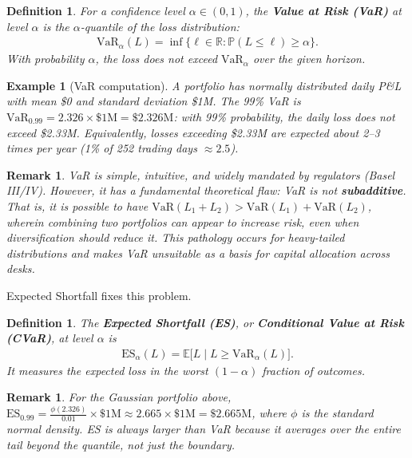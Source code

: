 \documentclass{report}
\theoremstyle{spacedplain}
\theoremstyle{spaceddefinition}
\newtheorem{definition}[theorem]{Definition}
\newtheorem{example}[theorem]{Example}
\theoremstyle{spacedremark}
\newtheorem{remark}[theorem]{Remark}
\begin{document}
\begin{definition}
For a confidence level $\alpha \in (0,1)$, the \textbf{Value at Risk (VaR)} at level $\alpha$ is the $\alpha$-quantile of the loss distribution:
\begin{align}
    \text{VaR}_\alpha(L) = \inf\bigl\{\ell \in \mathbb{R} : \mathbb{P}(L \leq \ell) \geq \alpha\bigr\}.
\end{align}
With probability $\alpha$, the loss does not exceed $\text{VaR}_\alpha$ over the given horizon.
\end{definition}

\begin{example}[VaR computation]
A portfolio has normally distributed daily P\&L with mean \$0 and standard deviation \$1M. The 99\% VaR is $\text{VaR}_{0.99} = 2.326 \times \$1\text{M} = \$2.326\text{M}$: with 99\% probability, the daily loss does not exceed \$2.33M. Equivalently, losses exceeding \$2.33M are expected about 2--3 times per year (1\% of 252 trading days $\approx 2.5$).
\end{example}

\begin{remark}
VaR is simple, intuitive, and widely mandated by regulators (Basel III/IV). However, it has a fundamental theoretical flaw: VaR is not \textbf{subadditive}. That is, it is possible to have $\text{VaR}(L_1 + L_2) > \text{VaR}(L_1) + \text{VaR}(L_2)$, wherein combining two portfolios can appear to increase risk, even when diversification should reduce it. This pathology occurs for heavy-tailed distributions and makes VaR unsuitable as a basis for capital allocation across desks.
\end{remark}

Expected Shortfall fixes this problem.

\begin{definition}
The \textbf{Expected Shortfall (ES)}, or \textbf{Conditional Value at Risk (CVaR)}, at level $\alpha$ is
\begin{align}
    \text{ES}_\alpha(L) = \mathbb{E}\bigl[L \mid L \geq \text{VaR}_\alpha(L)\bigr].
\end{align}
It measures the expected loss in the worst $(1-\alpha)$ fraction of outcomes.
\end{definition}

\begin{remark}
For the Gaussian portfolio above, $\text{ES}_{0.99} = \frac{\phi(2.326)}{0.01} \times \$1\text{M} \approx 2.665 \times \$1\text{M} = \$2.665\text{M}$, where $\phi$ is the standard normal density. ES is always larger than VaR because it averages over the entire tail beyond the quantile, not just the boundary. 
\end{remark}
\end{document}
